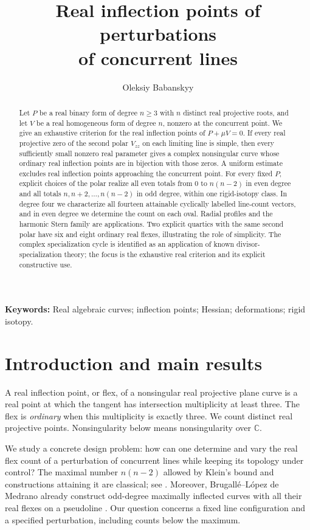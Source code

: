 \documentclass[11pt,a4paper]{article}
\title{Real inflection points of perturbations\\of concurrent lines}
\author{Oleksiy Babanskyy}
\date{}
\theoremstyle{remark}
\newcommand{\C}{\mathbb C}
\begin{document}
\maketitle

\begin{abstract}
Let \(P\) be a real binary form of degree \(n\geq3\) with \(n\)
distinct real projective roots, and let \(V\) be a real homogeneous
form of degree \(n\), nonzero at the concurrent point.
We give an exhaustive criterion for the real inflection points of
\(P+\mu V=0\). If every real projective zero of the second polar
\(V_{zz}\) on each limiting line is simple, then every sufficiently
small nonzero real parameter gives a complex nonsingular curve whose
ordinary real inflection points are in bijection with those zeros.
A uniform estimate excludes real inflection points approaching the
concurrent point. For every fixed \(P\), explicit choices of the polar
realize all even totals from \(0\) to \(n(n-2)\) in even degree and
all totals \(n,n+2,\ldots,n(n-2)\) in odd degree, within one
rigid-isotopy class. In degree four we characterize all fourteen
attainable cyclically labelled line-count vectors, and in even degree
we determine the count on each oval. Radial profiles and the harmonic
Stern family are applications. Two explicit quartics with the same
second polar have six and eight ordinary real flexes, illustrating
the role of simplicity. The complex specialization cycle is identified
as an application of known divisor-specialization theory; the focus
is the exhaustive real criterion and its explicit constructive use.
\end{abstract}

\noindent\textbf{Keywords:} Real algebraic curves; inflection points;
Hessian; deformations; rigid isotopy.

\section{Introduction and main results}

A real inflection point, or flex, of a nonsingular real projective
plane curve is a real point at which the tangent has intersection
multiplicity at least three. The flex is \emph{ordinary} when this
multiplicity is exactly three. We count distinct real projective
points. Nonsingularity below means nonsingularity over \(\C\).

We study a concrete design problem: how can one determine and vary
the real flex count of a perturbation of concurrent lines while
keeping its topology under control? The maximal number \(n(n-2)\)
allowed by Klein's bound and constructions attaining it are
classical; see \citep[Theorem~1.1]{brugallelopez}. Moreover,
Brugall\'e--L\'opez de Medrano already construct odd-degree
maximally inflected curves with all their real flexes on a
pseudoline \citep[Proposition~7.2]{brugallelopez}. Our question
concerns a fixed line configuration and a specified perturbation,
including counts below the maximum.
\end{document}
